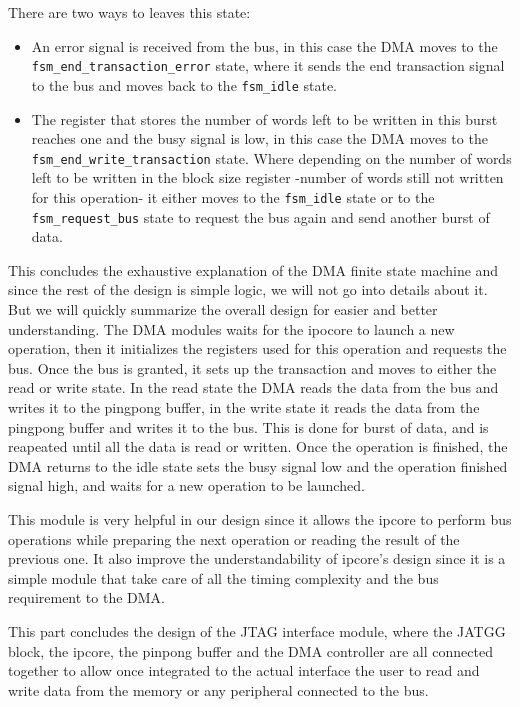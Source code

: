 \documentclass[a4paper,11pt,oneside]{report}
\begin{document}
There are two ways to leaves this state:
\begin{itemize}
    \item An error signal is received from the bus, in this case the DMA moves to the \texttt{fsm\_end\_transaction\_error} state, where it sends the end transaction signal to the bus and moves back to the \texttt{fsm\_idle} state.
    \item The register that stores the number of words left to be written in this burst reaches one and the busy signal is low, in this case the DMA moves to the \texttt{fsm\_end\_write\_transaction} state.
        Where depending on the number of words left to be written in the block size register -number of words still not written for this operation- it either moves to the \texttt{fsm\_idle} state or to the \texttt{fsm\_request\_bus} state 
        to request the bus again and send another burst of data.
\end{itemize}

This concludes the exhaustive explanation of the DMA finite state machine and since the rest of the design is simple logic, we will not go into details about it.
But we will quickly summarize the overall design for easier and better understanding.
The DMA modules waits for the ipocore to launch a new operation, then it initializes the registers used for this operation and requests the bus.
Once the bus is granted, it sets up the transaction and moves to either the read or write state.
In the read state the DMA reads the data from the bus and writes it to the pingpong buffer, in the write state it reads the data from the pingpong buffer and writes it to the bus.
This is done for burst of data, and is reapeated until all the data is read or written.
Once the operation is finished, the DMA returns to the idle state sets the busy signal low and the operation finished signal high, and waits for a new operation to be launched.

This module is very helpful in our design since it allows the ipcore to perform bus operations while preparing the next operation or reading the result of the previous one.
It also improve the understandability of ipcore's design since it is a simple module that take care of all the timing complexity and the bus requirement to the DMA.

This part concludes the design of the JTAG interface module, where the JATGG block, the ipcore, the pinpong buffer and the DMA controller are all connected together to allow
once integrated to the actual interface the user to read and write data from the memory or any peripheral connected to the bus.
\end{document}
